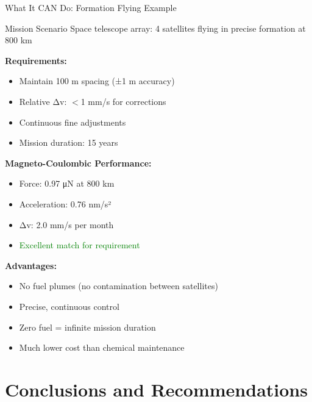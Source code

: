 \documentclass[aspectratio=169]{beamer}
\begin{document}
\begin{frame}{What It CAN Do: Formation Flying Example}
\begin{block}{Mission Scenario}
Space telescope array: 4 satellites flying in precise formation at 800 km
\end{block}

\vspace{0.5em}
\textbf{Requirements:}
\begin{itemize}
    \item Maintain 100 m spacing (±1 m accuracy)
    \item Relative Δv: $<$1 mm/s for corrections
    \item Continuous fine adjustments
    \item Mission duration: 15 years
\end{itemize}

\vspace{0.5em}
\textbf{Magneto-Coulombic Performance:}
\begin{itemize}
    \item Force: 0.97 μN at 800 km
    \item Acceleration: 0.76 nm/s²
    \item Δv: 2.0 mm/s per month
    \item \textcolor{green}{\checkmark Excellent match for requirement}
\end{itemize}

\vspace{0.5em}
\textbf{Advantages:}
\begin{itemize}
    \item No fuel plumes (no contamination between satellites)
    \item Precise, continuous control
    \item Zero fuel = infinite mission duration
    \item Much lower cost than chemical maintenance
\end{itemize}
\end{frame}

\section{Conclusions and Recommendations}
\end{document}
